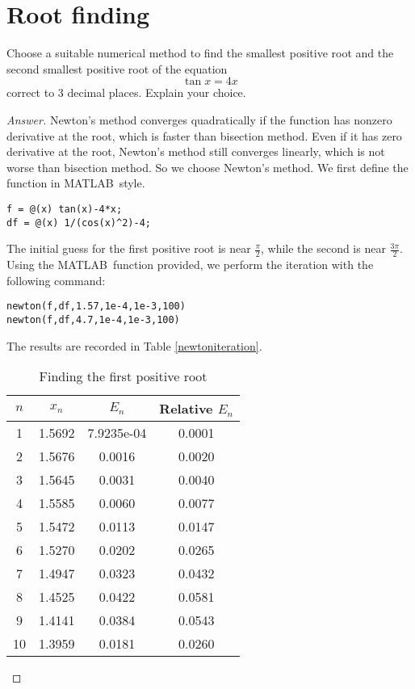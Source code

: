 \section{Root finding}
Choose a suitable numerical method to find the smallest positive root and the second smallest positive root of the equation
\[ \tan x = 4x \]
correct to 3 decimal places.
Explain your choice.
\begin{proof}[Answer]
Newton's method converges quadratically if the function has nonzero derivative at the root, which is faster than bisection method.
Even if it has zero derivative at the root, Newton's method still converges linearly, which is not worse than bisection method.
So we choose Newton's method.
We first define the function in MATLAB\texttrademark\ style.
\begin{lstlisting}[style=Matlab-editor]
f = @(x) tan(x)-4*x;
df = @(x) 1/(cos(x)^2)-4;
\end{lstlisting}
The initial guess for the first positive root is near \(\frac{\pi}{2}\), while the second is near \(\frac{3\pi}{2}\).
Using the MATLAB\texttrademark\ function provided, we perform the iteration with the following command:
\begin{lstlisting}[style=Matlab-editor]
newton(f,df,1.57,1e-4,1e-3,100)
newton(f,df,4.7,1e-4,1e-3,100)
\end{lstlisting}
The results are recorded in Table \ref{newtoniteration}.
\begin{table}[htbp]
	\begin{subtable}[t]{.48\linewidth}
		\centering
		\caption{Finding the first positive root}
		\begin{tabular}[t]{|c|c|c|c|}
		\hline
		$n$ & \(x_n\) & \(E_n\) & Relative \(E_n\) \\	\hline
		1	&	1.5692	&	7.9235e-04	&	0.0001\\	\hline
		2	&	1.5676	&	0.0016	&	0.0020	\\	\hline
		3	&	1.5645	&	0.0031	&	0.0040	\\	\hline
		4	&	1.5585	&	0.0060	&	0.0077	\\	\hline
		5	&	1.5472	&	0.0113	&	0.0147	\\	\hline
		6	&	1.5270	&	0.0202	&	0.0265	\\	\hline
		7	&	1.4947	&	0.0323	&	0.0432	\\	\hline
		8	&	1.4525	&	0.0422	&	0.0581	\\	\hline
		9	&	1.4141	&	0.0384	&	0.0543	\\	\hline
		10	&	1.3959	&	0.0181	&	0.0260	\\	\hline

\end{tabular}
\end{subtable}
\end{table}
\end{proof}

